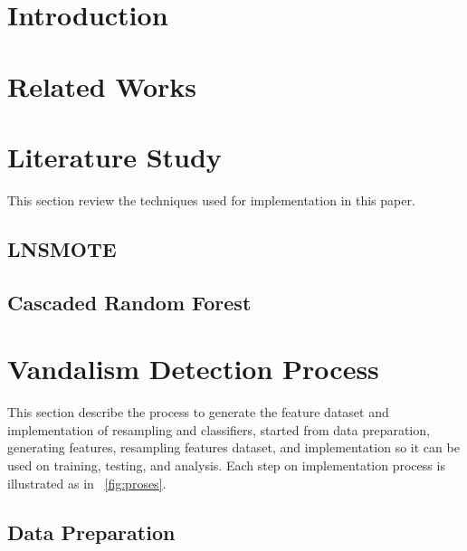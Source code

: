 







\section{Introduction}
\label{section:introduction}
	

\IEEEpubidadjcol

\section{Related Works}
	\label{section:related_works}
	

\section{Literature Study}
	\label{section:literature_study}

This section review the techniques used for implementation in this paper.

\subsection{LNSMOTE}
	\label{subsection:lnsmote}
	

\subsection{Cascaded Random Forest}
	\label{subsection:crf}
	

\section{Vandalism Detection Process}
	\label{section:research_methodology}

This section describe the process to generate the feature dataset and
implementation of resampling and classifiers, started from data preparation,
generating features, resampling features dataset, and implementation so it can
be used on training, testing, and analysis.
Each step on implementation process is illustrated as in \figurename\ \ref{fig:proses}.



\subsection{Data Preparation}
	\label{subsection:data_preparation}
	

